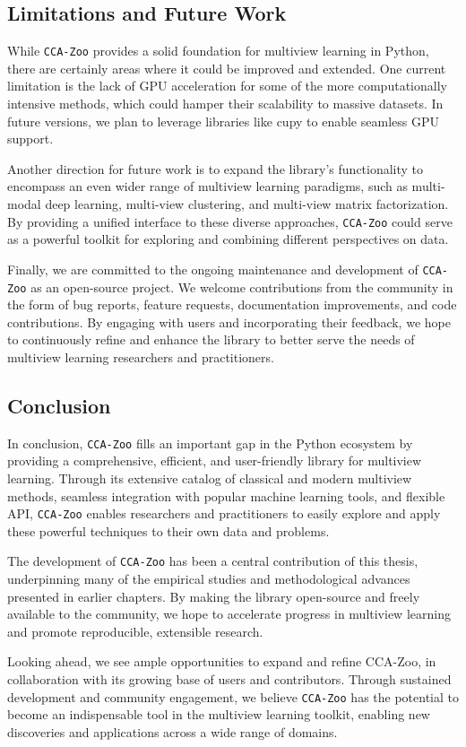 \subsection{Limitations and Future Work}

While \texttt{CCA-Zoo} provides a solid foundation for multiview learning in Python, there are certainly areas where it could be improved and extended. One current limitation is the lack of GPU acceleration for some of the more computationally intensive methods, which could hamper their scalability to massive datasets. In future versions, we plan to leverage libraries like cupy to enable seamless GPU support.

Another direction for future work is to expand the library's functionality to encompass an even wider range of multiview learning paradigms, such as multi-modal deep learning, multi-view clustering, and multi-view matrix factorization. By providing a unified interface to these diverse approaches, \texttt{CCA-Zoo} could serve as a powerful toolkit for exploring and combining different perspectives on data.

Finally, we are committed to the ongoing maintenance and development of \texttt{CCA-Zoo} as an open-source project. We welcome contributions from the community in the form of bug reports, feature requests, documentation improvements, and code contributions. By engaging with users and incorporating their feedback, we hope to continuously refine and enhance the library to better serve the needs of multiview learning researchers and practitioners.

\subsection{Conclusion}

In conclusion, \texttt{CCA-Zoo} fills an important gap in the Python ecosystem by providing a comprehensive, efficient, and user-friendly library for multiview learning. Through its extensive catalog of classical and modern multiview methods, seamless integration with popular machine learning tools, and flexible API, \texttt{CCA-Zoo} enables researchers and practitioners to easily explore and apply these powerful techniques to their own data and problems.

The development of \texttt{CCA-Zoo} has been a central contribution of this thesis, underpinning many of the empirical studies and methodological advances presented in earlier chapters. By making the library open-source and freely available to the community, we hope to accelerate progress in multiview learning and promote reproducible, extensible research.

Looking ahead, we see ample opportunities to expand and refine CCA-Zoo, in collaboration with its growing base of users and contributors. Through sustained development and community engagement, we believe \texttt{CCA-Zoo} has the potential to become an indispensable tool in the multiview learning toolkit, enabling new discoveries and applications across a wide range of domains.